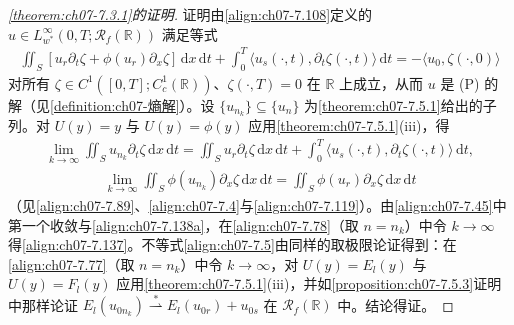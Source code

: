 \documentclass[../../main.tex]{subfiles}%
\begin{document}
\begin{proof}[\cref{theorem:ch07-7.3.1}的证明]
证明由\eqref{align:ch07-7.108}定义的 $u\in L^\infty_{w^*}(0,T;\mathscr{R}_f(\mathbb{R}))$ 满足等式
\begin{align}
\iint_S[u_r\partial_t\zeta+\phi(u_r)\partial_x\zeta]\,\mathrm{d}x\,\mathrm{d}t
+\int_0^T\langle u_s(\cdot,t),\partial_t\zeta(\cdot,t)\rangle\,\mathrm{d}t
=-\langle u_0,\zeta(\cdot,0)\rangle \label{align:ch07-7.137}
\end{align}
对所有 $\zeta\in C^1([0,T];C^1_c(\mathbb{R}))$、$\zeta(\cdot,T)=0$ 在 $\mathbb{R}$ 上成立，从而 $u$ 是 (P) 的解（见\cref{definition:ch07-熵解}）。设 $\{u_{n_k}\}\subseteq\{u_n\}$ 为\cref{theorem:ch07-7.5.1}给出的子列。对 $U(y)=y$ 与 $U(y)=\phi(y)$ 应用\cref{theorem:ch07-7.5.1}(iii)，得
\begin{align}
\lim_{k\to\infty}\iint_S u_{n_k}\partial_t\zeta\,\mathrm{d}x\,\mathrm{d}t
=\iint_S u_r\partial_t\zeta\,\mathrm{d}x\,\mathrm{d}t+\int_0^T\langle u_s(\cdot,t),\partial_t\zeta(\cdot,t)\rangle\,\mathrm{d}t, \label{align:ch07-7.138a}
\end{align}
\begin{align}
\lim_{k\to\infty}\iint_S\phi(u_{n_k})\partial_x\zeta\,\mathrm{d}x\,\mathrm{d}t
=\iint_S\phi(u_r)\partial_x\zeta\,\mathrm{d}x\,\mathrm{d}t \label{align:ch07-7.138b}
\end{align}
（见\eqref{align:ch07-7.89}、\eqref{align:ch07-7.4}与\eqref{align:ch07-7.119}）。由\eqref{align:ch07-7.45}中第一个收敛与\eqref{align:ch07-7.138a}，在\eqref{align:ch07-7.78}（取 $n=n_k$）中令 $k\to\infty$ 得\eqref{align:ch07-7.137}。不等式\eqref{align:ch07-7.5}由同样的取极限论证得到：在\eqref{align:ch07-7.77}（取 $n=n_k$）中令 $k\to\infty$，对 $U(y)=E_l(y)$ 与 $U(y)=F_l(y)$ 应用\cref{theorem:ch07-7.5.1}(iii)，并如\cref{proposition:ch07-7.5.3}证明中那样论证 $E_l(u_{0n_k})\stackrel{*}{\rightharpoonup}E_l(u_{0r})+u_{0s}$ 在 $\mathscr{R}_f(\mathbb{R})$ 中。结论得证。
\end{proof}
\end{document}
